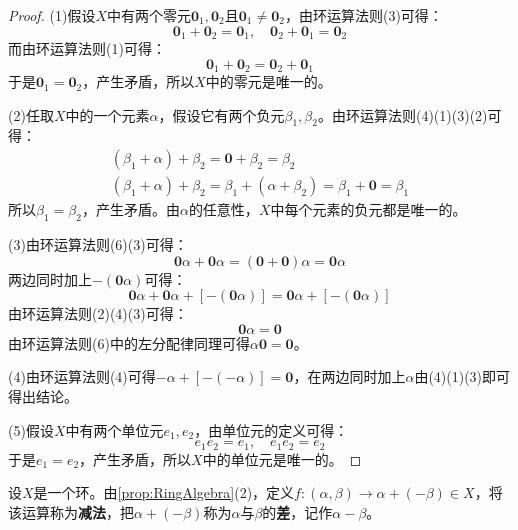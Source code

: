 \begin{proof}
	(1)假设$X$中有两个零元$\mathbf{0}_1,\mathbf{0}_2$且$\mathbf{0}_1\ne\mathbf{0}_2$，由环运算法则(3)可得：
	\begin{equation*}
		\mathbf{0}_1+\mathbf{0}_2=\mathbf{0}_1,\quad\mathbf{0}_2+\mathbf{0}_1=\mathbf{0}_2
	\end{equation*}
	而由环运算法则(1)可得：
	\begin{equation*}
		\mathbf{0}_1+\mathbf{0}_2=\mathbf{0}_2+\mathbf{0}_1
	\end{equation*}
	于是$\mathbf{0}_1=\mathbf{0}_2$，产生矛盾，所以$X$中的零元是唯一的。\par
	(2)任取$X$中的一个元素$\alpha$，假设它有两个负元$\beta_1,\beta_2$。由环运算法则(4)(1)(3)(2)可得：
	\begin{gather*}
		(\beta_1+\alpha)+\beta_2=\mathbf{0}+\beta_2=\beta_2 \\
		(\beta_1+\alpha)+\beta_2=\beta_1+(\alpha+\beta_2)=\beta_1+\mathbf{0}=\beta_1
	\end{gather*}
	所以$\beta_1=\beta_2$，产生矛盾。由$\alpha$的任意性，$X$中每个元素的负元都是唯一的。\par
	(3)由环运算法则(6)(3)可得：
	\begin{equation*}
		\mathbf{0}\alpha+\mathbf{0}\alpha=(\mathbf{0}+\mathbf{0})\alpha=\mathbf{0}\alpha
	\end{equation*}
	两边同时加上$-(\mathbf{0}\alpha)$可得：
	\begin{equation*}
		\mathbf{0}\alpha+\mathbf{0}\alpha+[-(\mathbf{0}\alpha)]=\mathbf{0}\alpha+[-(\mathbf{0}\alpha)]
	\end{equation*}
	由环运算法则(2)(4)(3)可得：
	\begin{equation*}
		\mathbf{0}\alpha=\mathbf{\mathbf{0}}
	\end{equation*}
	由环运算法则(6)中的左分配律同理可得$\alpha\mathbf{0}=\mathbf{0}$。\par
	(4)由环运算法则(4)可得$-\alpha+[-(-\alpha)]=\mathbf{0}$，在两边同时加上$\alpha$由(4)(1)(3)即可得出结论。\par
	(5)假设$X$中有两个单位元$e_1,e_2$，由单位元的定义可得：
	\begin{equation*}
		e_1e_2=e_1,\quad e_1e_2=e_2
	\end{equation*}
	于是$e_1=e_2$，产生矛盾，所以$X$中的单位元是唯一的。
\end{proof}
\begin{definition}
	设$X$是一个环。由\cref{prop:RingAlgebra}(2)，定义$f:(\alpha,\beta)\rightarrow\alpha+(-\beta)\in X$，将该运算称为\textbf{减法}，把$\alpha+(-\beta)$称为$\alpha$与$\beta$的\textbf{差}，记作$\alpha-\beta$。
\end{definition}
